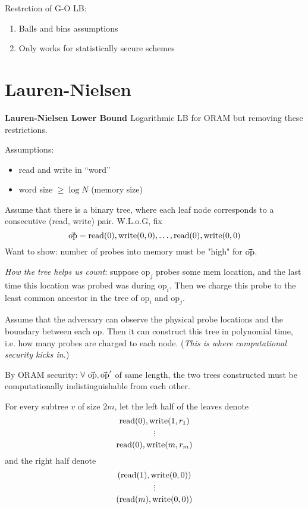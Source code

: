 {\noindent Restrction of G-O LB:
\begin{enumerate}
  \item Balls and bins assumptions
  \item Only works for statistically secure schemes
\end{enumerate}
}

\section{Lauren-Nielsen}

\textbf{Lauren-Nielsen Lower Bound \cite{larsen18lowerbound}} Logarithmic LB for ORAM but removing these restrictions.

\noindent Assumptions:
\begin{itemize}
  \item read and write in ``word''
  \item word size $\geq \log N$ (memory size)
\end{itemize}

Assume that there is a binary tree, where each leaf node corresponds to a consecutive (read, write) pair. W.L.o.G, fix 
$$\vec{\mbox{op}} = \mbox{read}(0), \mbox{write}(0, 0), \dots, \mbox{read}(0), \mbox{write}(0, 0)$$
Want to show: number of probes into memory must be "high" for $\vec{\mbox{op}}$.

\noindent \emph{How the tree helps us count}: suppose $\mbox{op}_j$ probes some mem location, and the last time this location was probed was during $\mbox{op}_i$. Then we charge this probe to the least common ancestor in the tree of $\mbox{op}_i$ and $\mbox{op}_j$.


Assume that the adversary can observe the physical probe locations and the boundary between each $\mbox{op}$. Then it can construct this tree in polynomial time, i.e. how many probes are charged to each node. (\emph{This is where computational security kicks in.})

By ORAM security: $\forall\ \vec{\mbox{op}}, \vec{\mbox{op}}'$ of same length, the two trees constructed must be computationally indistinguishable from each other.

For every subtree $v$ of size $2m$, let the left half of the leaves denote
$$\mbox{read}(0), \mbox{write}(1, r_1)$$
$$\vdots$$
$$\mbox{read}(0), \mbox{write}(m, r_m)$$
and the right half denote
$$(\mbox{read}(1), \mbox{write}(0, 0))$$
$$\vdots$$
$$(\mbox{read}(m), \mbox{write}(0, 0))$$

